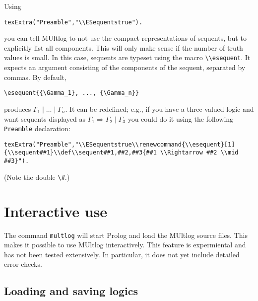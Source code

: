\documentclass[
]{article}
\newcommand{\passthrough}[1]{#1}
\begin{document}
Using

\begin{lstlisting}
texExtra("Preamble","\\ESequentstrue").
\end{lstlisting}

you can tell MUltlog to not use the compact representations of sequents,
but to explicitly list all components. This will only make sense if the
number of truth values is small. In this case, sequents are typeset
using the macro \passthrough{\lstinline!\\esequent!}. It expects an
argument consisting of the components of the sequent, separated by
commas. By default,

\begin{lstlisting}
\esequent{{\Gamma_1}, ..., {\Gamma_n}}
\end{lstlisting}

produces \(\Gamma_1 \mid \dots \mid \Gamma_n\). It can be redefined;
e.g., if you have a three-valued logic and want sequents displayed as
\(\Gamma_1 \Rightarrow \Gamma_2 \mid \Gamma_3\) you could do it using
the following \passthrough{\lstinline!Preamble!} declaration:

\begin{lstlisting}
texExtra("Preamble","\\ESequentstrue\\renewcommand{\\esequent}[1]{\\sequent##1}\\def\\sequent##1,##2,##3{##1 \\Rightarrow ##2 \\mid ##3}").
\end{lstlisting}

(Note the double \passthrough{\lstinline!\#!}.)

\hypertarget{interactive-use}{%
\section{Interactive use}\label{interactive-use}}

The command \passthrough{\lstinline!multlog!} will start Prolog and load
the MUltlog source files. This makes it possible to use MUltlog
interactively. This feature is expermiental and has not been tested
extensively. In particular, it does not yet include detailed error
checks.

\hypertarget{loading-and-saving-logics}{%
\subsection{Loading and saving logics}\label{loading-and-saving-logics}}
\end{document}
